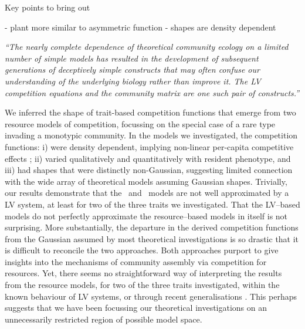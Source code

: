 \documentclass[a4paper,11pt]{article}
\begin{document}
Key points to bring out

- plant more similar to asymmetric function
- shapes are density dependent


\emph{``The nearly complete dependence of theoretical community ecology on a limited number of simple models has resulted in the development of subsequent generations of deceptively simple constructs that may often confuse our understanding of the underlying biology rather than improve it. The
LV competition equations and the community matrix are one such pair of constructs.''} \citep{Neill-1974}

We inferred the shape of trait-based competition functions that emerge from two resource models of competition, focussing on the special case of a rare type invading a monotypic community. In the models we investigated, the competition functions: i) were density dependent, implying non-linear per-capita competitive effects \citep{Abrams-1980}; ii) varied qualitatively and quantitatively with resident phenotype, and iii) had shapes that were distinctly non-Gaussian, suggesting limited connection with the wide array of theoretical models assuming Gaussian shapes. Trivially, our results demonstrate that the \Rstar\ and \plant\ models are not well approximated by a LV system, at least for two of the three traits we investigated. That the LV--based models do not perfectly approximate the resource--based models in itself is not surprising. More substantially, the departure in the derived competition functions from the Gaussian assumed by most theoretical investigations is so drastic that it is difficult to reconcile the two approaches.
Both approaches purport to give insights into the mechanisms of community assembly via competition for resources.
Yet, there seems no straightforward way of interpreting the results from the resource models, for two of the three traits investigated, within the known behaviour of LV systems, or through recent generalisations \citep{Leimar-2013}. This perhaps suggests that we have been focussing our theoretical investigations on an unnecessarily restricted region of possible model space.
\end{document}
